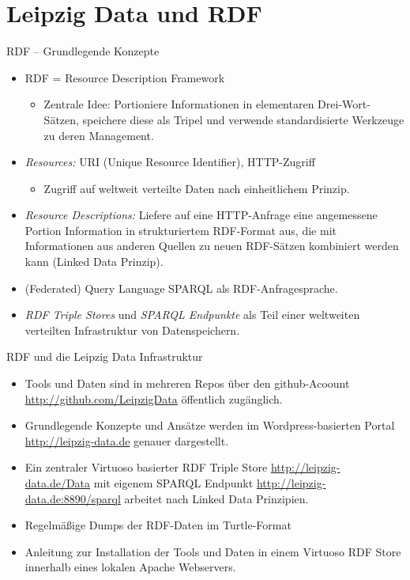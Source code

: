 \documentclass{beamer}
\begin{document}
\section{Leipzig Data und RDF}
\begin{frame}{RDF -- Grundlegende Konzepte}{}\small
\begin{itemize}
\item RDF = Resource Description Framework
\begin{itemize}\small
\item Zentrale Idee: Portioniere Informationen in elementaren Drei-Wort-Sätzen,
  speichere diese als Tripel und verwende standardisierte Werkzeuge zu deren
  Management.
\end{itemize}
\item \emph{Resources:} URI (Unique Resource Identifier), HTTP-Zugriff
\begin{itemize}\scriptsize
\item Zugriff auf weltweit verteilte Daten nach einheitlichem Prinzip.
\end{itemize}
\item \emph{Resource Descriptions:} Liefere auf eine HTTP-Anfrage eine
  angemessene Portion Information in strukturiertem RDF-Format aus, die mit
  Informationen aus anderen Quellen zu neuen RDF-Sätzen kombiniert werden kann
  (Linked Data Prinzip).
\item (Federated) Query Language SPARQL als RDF-Anfragesprache.
\item \emph{RDF Triple Stores} und \emph{SPARQL Endpunkte} als Teil einer
  weltweiten verteilten Infrastruktur von Datenspeichern.
\end{itemize}
\end{frame}

\begin{frame}{RDF und die Leipzig Data Infrastruktur}{}\small
\begin{itemize}
\item Tools und Daten sind in mehreren Repos über den github-Acoount
  \url{http://github.com/LeipzigData} öffentlich zugänglich. 
\item Grundlegende Konzepte und Ansätze werden im Wordpress-basierten Portal
  \url{http://leipzig-data.de} genauer dargestellt.
\item Ein zentraler Virtuoso basierter RDF Triple Store
  \url{http://leipzig-data.de/Data} mit eigenem SPARQL Endpunkt
  \url{http://leipzig-data.de:8890/sparql} arbeitet nach Linked Data
  Prinzipien.
\item Regelmäßige Dumps der RDF-Daten im Turtle-Format
\item Anleitung zur Installation der Tools und Daten in einem Virtuoso RDF
  Store innerhalb eines lokalen Apache Webservers.
\end{itemize}
\end{frame}
\end{document}
